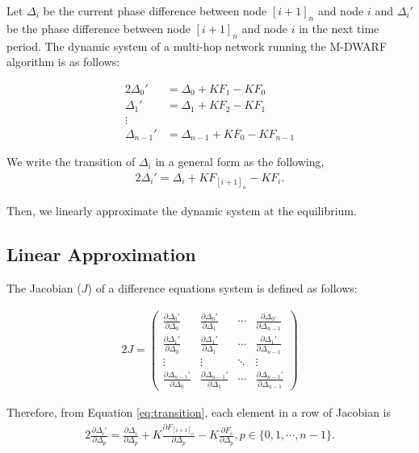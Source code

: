 Let $\Delta_i$ be the current phase difference between node $[i+1]_n$ and node $i$ and $\Delta_i'$ be the phase difference between node $[i+1]_n$ and node $i$ in the next time period.  The dynamic system of a multi-hop network running the M-DWARF algorithm is as follows: 

\begin{alignat}{2}
\Delta_0' &= \Delta_{0} + KF_{1} - KF_0 \nonumber \\
\Delta_1' &= \Delta_{1} + KF_{2} - KF_1 \nonumber \\
\vdots \nonumber \\
\Delta_{n-1}' &= \Delta_{n-1} + KF_{0} - KF_{n-1}
\end{alignat}

We write the transition of $\Delta_i$ in a general form as the following,
\begin{alignat}{2}
\Delta_i' = \Delta_{i} + KF_{[i+1]_n} - KF_i. 
\label{eq:transition}
\end{alignat}

Then, we linearly approximate the dynamic system at the equilibrium.

\subsection{Linear Approximation}
The Jacobian ($J$) of a difference equations system is defined as follows:

\begin{alignat}{2}
J=\begin{pmatrix} 
\frac{\partial \Delta_{0}'}{\partial \Delta_{0}}  & \frac{\partial \Delta_{0}'}{\partial \Delta_{1}}  & \cdots & \frac{\partial \Delta_{0'}}{\partial \Delta_{n-1}} \\ 
\frac{\partial \Delta_{1}'}{\partial \Delta_{0}}  & \frac{\partial \Delta_{1}'}{\partial \Delta_{1}}   & \cdots & \frac{\partial \Delta_{1}'}{\partial \Delta_{n-1}} \\ 
\vdots & \vdots & \ddots & \vdots \\
\frac{\partial \Delta_{n-1}'}{\partial \Delta_{0}}  & \frac{\partial \Delta_{n-1}'}{\partial \Delta_{1}} & \cdots &  \frac{\partial \Delta_{n-1}'}{\partial \Delta_{n-1}}
\end{pmatrix}
\end{alignat}

Therefore, from Equation \ref{eq:transition}, each element in a row of Jacobian is
\begin{alignat}{2}
\frac{\partial \Delta_i'}{\partial \Delta_p} = \frac{\partial\Delta_{i}}{\partial \Delta_p} + K\frac{\partial F_{[i+1]_n}}{\partial \Delta_p} - K\frac{\partial F_i}{\partial \Delta_p}, p \in \{0,1,\cdots,n-1\}.
\label{eq:element}
\end{alignat}

